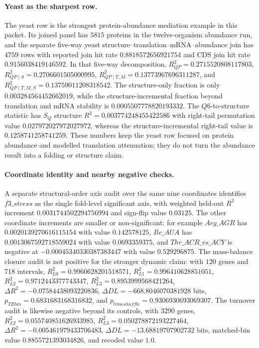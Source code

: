 \paragraph{Yeast as the sharpest row.}
The yeast row is the strongest protein-abundance mediation example in this packet.  Its joined panel has $5815$ proteins in the twelve-organism abundance run, and the separate five-way yeast structure--translation--mRNA--abundance join has $4759$ rows with reported join hit rate $0.8818572656921754$ and CDS join hit rate $0.9156038419146592$.  In that five-way decomposition, $R^2_{QP}=0.2715520808117803$, $R^2_{QP\mid S}=0.2706601505000995$, $R^2_{QP\mid T,M}=0.13773967696311287$, and $R^2_{QP\mid T,M,S}=0.13759011208318542$.  The structure-only fraction is only $0.003284564452662019$, while the structure-incremental fraction beyond translation and mRNA stability is $0.0005507778820193332$.  The $Q6$-to-structure statistic has $S_Q$ structure $R^2=0.003774248455422586$ with right-tail permutation value $0.027972027972027972$, whereas the structure-incremental right-tail value is $0.1258741258741259$.  These numbers keep the yeast row focused on protein abundance and modelled translation attenuation; they do not turn the abundance result into a folding or structure claim.

\paragraph{Coordinate identity and nearby negative checks.}
A separate structural-order axis audit over the same nine coordinates identifies $f3\_stress$ as the single fold-level significant axis, with weighted held-out $R^2$ increment $0.0031744502294756994$ and sign-flip value $0.03125$.  The other coordinate increments are smaller or non-significant: for example $Arg\_AGR$ has $0.0020139270616115154$ with value $0.142578125$, $Ile\_AUA$ has $0.0013067592718559024$ with value $0.0693359375$, and $Thr\_ACR\_vs\_ACY$ is negative at $-0.00045340330387383447$ with value $0.529296875$.  The mass-balance closure audit is not positive for the stronger dynamic claim: with $120$ genes and $718$ intervals, $R^2_{L0}=0.9960628201518571$, $R^2_{L1}=0.996410628851051$, $R^2_{L2}=0.9712443377743347$, $R^2_{L3}=0.8953999568421264$, $\Delta R^2=-0.07584438093220836$, $\Delta DL=-668.8046070381928$ bits, $p_{TEbin}=0.6831683168316832$, and $p_{timeshuffle}=0.9306930693069307$.  The turnover audit is likewise negative beyond its controls, with $3290$ genes, $R^2_{L2}=0.055740851626933985$, $R^2_{L3}=0.050278872193227464$, $\Delta R^2=-0.005461979433706483$, $\Delta DL=-13.68819707902732$ bits, matched-bin value $0.8855721393034826$, and recoded value $1.0$.

